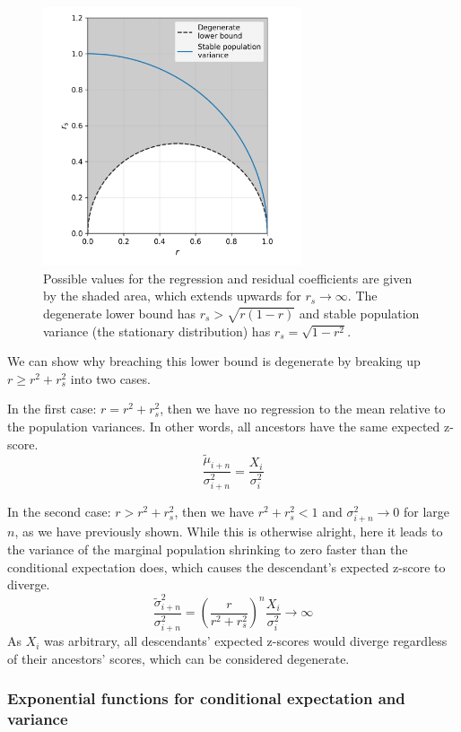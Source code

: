 \documentclass[a4paper,11pt]{article} %
\begin{document}
\begin{figure}[h]
\includegraphics[width=3in]{figures/possible_r_rs.png}
\centering
\caption{Possible values for the regression and residual coefficients are given by the shaded area, which extends upwards for $r_s \rightarrow \infty$. The degenerate lower bound has $r_s > \sqrt{r(1-r)}$ and stable population variance (the stationary distribution) has $r_s = \sqrt{1-r^2}$.}
\label{fig:possible_r_rs}
\end{figure}

We can show why breaching this lower bound is degenerate by breaking up $r \geq r^2 + r_s^2$ into two cases.

In the first case: $r = r^2 + r_s^2$, then we have no regression to the mean relative to the population variances. In other words, all ancestors have the same expected z-score.
$$\frac{\tilde{\mu}_{i+n}}{\sigma_{i+n}^2} = \frac{X_i}{\sigma_i^2}$$


In the second case: $r > r^2 + r_s^2$, then we have $r^2 + r_s^2 < 1$ and $\sigma_{i+n}^2 \rightarrow 0$ for large $n$, as we have previously shown. While this is otherwise alright, here it leads to the variance of the marginal population shrinking to zero faster than the conditional expectation does, which causes the descendant's expected z-score to diverge.
$$\frac{\tilde{\sigma}_{i+n}^2}{\sigma_{i+n}^2} = (\frac{r}{r^2+r_s^2})^n \frac{X_i}{\sigma_i^2} \rightarrow \infty$$
As $X_i$ was arbitrary, all descendants' expected z-scores would diverge regardless of their ancestors' scores, which can be considered degenerate. 


\subsubsection*{Exponential functions for conditional expectation and variance}
\end{document}
